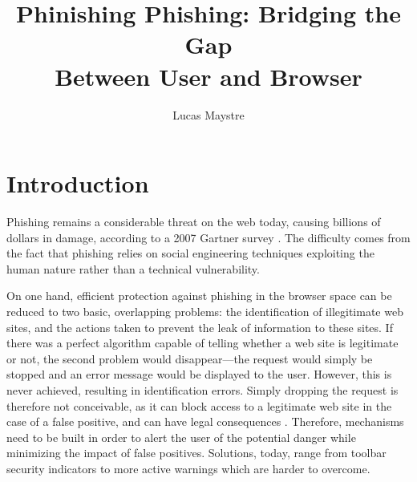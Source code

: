 \documentclass[11pt,styles/chicago]{article}
\title{Phinishing Phishing: Bridging the Gap \\ Between User and Browser}
\author{Lucas Maystre}
\begin{document}
\maketitle




\section{Introduction} %

Phishing remains a considerable threat on the web today, causing billions of dollars in damage, according to a 2007 Gartner survey \cite{gartnersurvey}. The difficulty comes from the fact that phishing relies on social engineering techniques exploiting the human nature rather than a technical vulnerability.

On one hand, efficient protection against phishing in the browser space can be reduced to two basic, overlapping problems: the identification of illegitimate web sites, and the actions taken to prevent the leak of information to these sites. If there was a perfect algorithm capable of telling whether a web site is legitimate or not, the second problem would disappear---the request would simply be stopped and an error message would be displayed to the user. However, this is never achieved, resulting in identification errors. Simply dropping the request is therefore not conceivable, as it can block access to a legitimate web site in the case of a false positive, and can have legal consequences \cite{sheng2009improving}. Therefore, mechanisms need to be built in order to alert the user of the potential danger while minimizing the impact of false positives. Solutions, today, range from toolbar security indicators to more active warnings which are harder to overcome.
\end{document}

